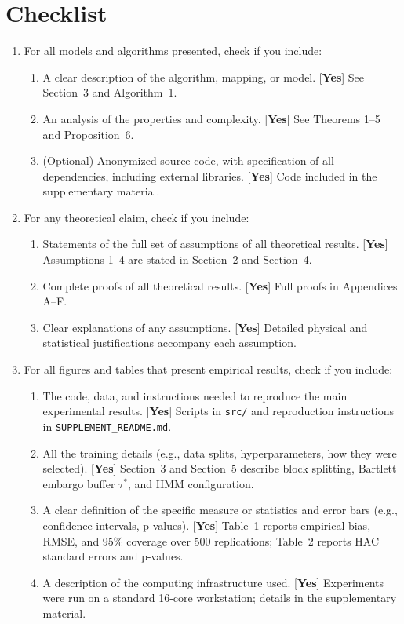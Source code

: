 \documentclass[twoside]{article}
\theoremstyle{definition}
\begin{document}
\section*{Checklist}
\begin{enumerate}
\item For all models and algorithms presented, check if you include:
\begin{enumerate}
  \item A clear description of the algorithm, mapping, or model. [\textbf{Yes}] See Section~3 and Algorithm~1.
  \item An analysis of the properties and complexity. [\textbf{Yes}] See Theorems 1--5 and Proposition~6.
  \item (Optional) Anonymized source code, with specification of all dependencies, including external libraries. [\textbf{Yes}] Code included in the supplementary material.
\end{enumerate}

\item For any theoretical claim, check if you include:
\begin{enumerate}
  \item Statements of the full set of assumptions of all theoretical results. [\textbf{Yes}] Assumptions 1--4 are stated in Section~2 and Section~4.
  \item Complete proofs of all theoretical results. [\textbf{Yes}] Full proofs in Appendices A--F.
  \item Clear explanations of any assumptions. [\textbf{Yes}] Detailed physical and statistical justifications accompany each assumption.
\end{enumerate}

\item For all figures and tables that present empirical results, check if you include:
\begin{enumerate}
  \item The code, data, and instructions needed to reproduce the main experimental results. [\textbf{Yes}] Scripts in \texttt{src/} and reproduction instructions in \texttt{SUPPLEMENT\_README.md}.
  \item All the training details (e.g., data splits, hyperparameters, how they were selected). [\textbf{Yes}] Section~3 and Section~5 describe block splitting, Bartlett embargo buffer $\tau^*$, and HMM configuration.
  \item A clear definition of the specific measure or statistics and error bars (e.g., confidence intervals, p-values). [\textbf{Yes}] Table~1 reports empirical bias, RMSE, and 95\% coverage over 500 replications; Table~2 reports HAC standard errors and p-values.
  \item A description of the computing infrastructure used. [\textbf{Yes}] Experiments were run on a standard 16-core workstation; details in the supplementary material.
\end{enumerate}


\end{enumerate}
\end{document}
